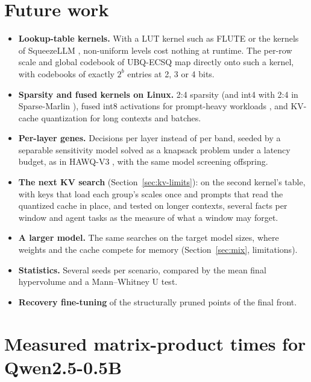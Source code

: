 \documentclass[11pt]{article}
\begin{document}
\section{Future work}
\label{sec:future}
\begin{itemize}
  \item \textbf{Lookup-table kernels.} With a LUT kernel such as FLUTE \cite{guo2024flute} or the kernels
        of SqueezeLLM \cite{kim2024squeezellm}, non-uniform levels cost nothing at runtime. The per-row
        scale and global codebook of UBQ-ECSQ map directly onto such a kernel, with codebooks of exactly
        $2^b$ entries at 2, 3 or 4 bits.
  \item \textbf{Sparsity and fused kernels on Linux.} 2:4 sparsity \cite{mishra2021sparse} (and int4
        with 2:4 in Sparse-Marlin \cite{frantar2025marlin}), fused int8 activations for prompt-heavy
        workloads \cite{xiao2023smoothquant,ashkboos2024quarot}, and KV-cache quantization for long
        contexts and batches.
  \item \textbf{Per-layer genes.} Decisions per layer instead of per band, seeded by a separable
        sensitivity model solved as a knapsack problem under a latency budget, as in HAWQ-V3
        \cite{yao2021hawqv3}, with the same model screening offspring.
  \item \textbf{The next KV search} (Section~\ref{sec:kv-limits}): on the second kernel's table, with keys
        that load each group's scales once and prompts that read the quantized cache in place, and tested on
        longer contexts, several facts per window and agent tasks as the measure of what a window may forget.
  \item \textbf{A larger model.} The same searches on the target model sizes, where weights and the cache
        compete for memory (Section~\ref{sec:mix}, limitations).
  \item \textbf{Statistics.} Several seeds per scenario, compared by the mean final hypervolume and a
        Mann--Whitney U test.
  \item \textbf{Recovery fine-tuning} of the structurally pruned points of the final front.
\end{itemize}

\appendix

\section{Measured matrix-product times for Qwen2.5-0.5B}
\label{app:table}
\end{document}
